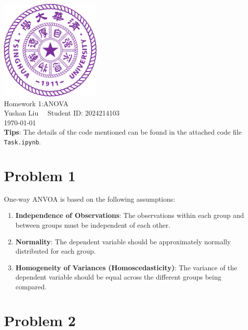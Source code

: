 \documentclass[12pt]{article}
\begin{document}
\begin{titlepage}
    \begin{center}
        \includegraphics[width=5cm]{tsinghua_logo.png}\\[4cm]  %
        {\Huge Homework 1:ANOVA} \\[2cm]
        {\large Yushan Liu  \ \  Student ID: 2024214103}\\[6cm]
        {\normalsize \today}\\[1cm]
        \vfill
        \textbf{Tips}: The details of the code mentioned can be found in the attached code file \texttt{Task.ipynb}.
    
    \end{center}
\end{titlepage}

\section*{Problem 1}

One-way ANVOA is based on the following assumptions:

\begin{enumerate}
    \item \textbf{Independence of Observations}: The observations within each group and between groups must be independent of each other.
    
    \item \textbf{Normality}: The dependent variable should be approximately normally distributed for each group.
    
    \item \textbf{Homogeneity of Variances (Homoscedasticity)}: The variance of the dependent variable should be equal across the different groups being compared.
\end{enumerate}

\section*{Problem 2}
\end{document}
